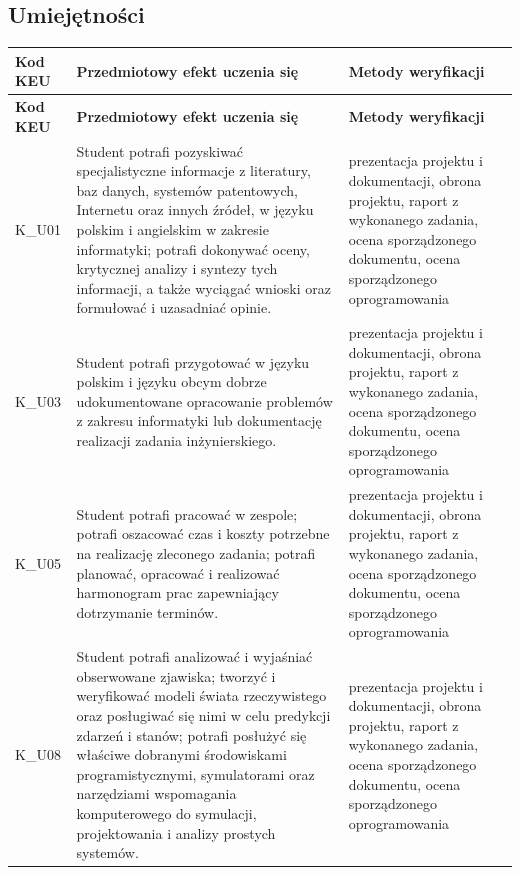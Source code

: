 \documentclass[12pt, a4paper]{article}
\newcommand{\thdrule}{\noalign{\global\setlength{\extrarowheight}{0pt}}}
\newcommand{\thdend}{\noalign{\global\setlength{\extrarowheight}{3pt}}}
\begin{document}
\subsection*{Umiejętności}
{\scriptsize
\begin{longtable}{m{1.6cm}m{9.0cm}m{4.2cm}}
\thdrule\toprule
\rowcolor{pjatkRed} {\color{white}\footnotesize\textbf{\vphantom{Ag}Kod KEU}} & {\color{white}\footnotesize\textbf{\vphantom{Ag}Przedmiotowy efekt uczenia się}} & {\color{white}\footnotesize\textbf{\vphantom{Ag}Metody weryfikacji}} \\
\midrule\thdend
\endfirsthead
\thdrule\toprule
\rowcolor{pjatkRed} {\color{white}\footnotesize\textbf{\vphantom{Ag}Kod KEU}} & {\color{white}\footnotesize\textbf{\vphantom{Ag}Przedmiotowy efekt uczenia się}} & {\color{white}\footnotesize\textbf{\vphantom{Ag}Metody weryfikacji}} \\
\midrule\thdend
\endhead
  \rowcolor{tableRowLight} K\_U01 & Student potrafi pozyskiwać specjalistyczne informacje z literatury, baz danych, systemów patentowych, Internetu oraz innych źródeł, w języku polskim i angielskim w zakresie informatyki; potrafi dokonywać oceny, krytycznej analizy i syntezy tych informacji,  a także wyciągać wnioski oraz formułować i uzasadniać opinie. & prezentacja projektu i dokumentacji, obrona projektu, raport z wykonanego zadania, ocena sporządzonego dokumentu, ocena sporządzonego oprogramowania \\
  \rowcolor{tableRowAlt} K\_U03 & Student potrafi przygotować w języku polskim i języku obcym dobrze udokumentowane opracowanie problemów z zakresu informatyki lub dokumentację realizacji zadania inżynierskiego. & prezentacja projektu i dokumentacji, obrona projektu, raport z wykonanego zadania, ocena sporządzonego dokumentu, ocena sporządzonego oprogramowania \\
  \rowcolor{tableRowLight} K\_U05 & Student potrafi pracować w zespole; potrafi oszacować czas i koszty potrzebne na realizację zleconego zadania; potrafi planować, opracować i realizować harmonogram prac zapewniający dotrzymanie terminów. & prezentacja projektu i dokumentacji, obrona projektu, raport z wykonanego zadania, ocena sporządzonego dokumentu, ocena sporządzonego oprogramowania \\
  \rowcolor{tableRowAlt} K\_U08 & Student potrafi analizować i wyjaśniać obserwowane zjawiska; tworzyć i weryfikować modeli świata rzeczywistego oraz posługiwać się nimi w celu predykcji zdarzeń i stanów; potrafi posłużyć się właściwe dobranymi środowiskami programistycznymi, symulatorami oraz narzędziami wspomagania komputerowego do symulacji, projektowania i analizy prostych systemów. & prezentacja projektu i dokumentacji, obrona projektu, raport z wykonanego zadania, ocena sporządzonego dokumentu, ocena sporządzonego oprogramowania \\

\end{longtable}}
\end{document}
